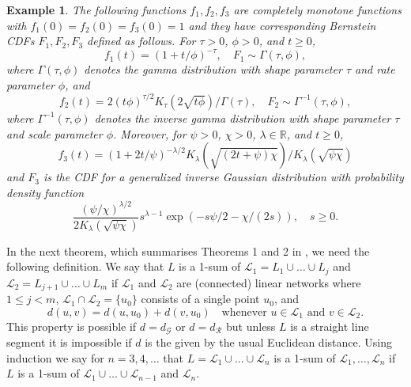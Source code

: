 \documentclass[alpha-refs]{wiley-article}
\newtheorem{ex}{Example}
\begin{document}
\begin{ex}\label{ex:0} 
The following functions $f_1,f_2,f_3$ are completely monotone functions with $f_1(0)=f_2(0)=f_3(0)=1$ and they have corresponding Bernstein CDFs $F_1,F_2,F_3$ defined as follows.
For $\tau>0$, $\phi>0$, and $t\ge0$,
\begin{equation}\label{e:f_1}
f_1(t)=(1+t/\phi)^{-\tau},\quad F_1\sim\Gamma(\tau,\phi),
\end{equation}
where $\Gamma(\tau,\phi)$ denotes the gamma distribution with shape parameter $\tau$ and rate parameter $\phi$, and
\begin{equation}\label{e:f_2}
f_2(t)={2(t\phi)^{\tau/2}}K_\tau(2\sqrt{t\phi})/{\Gamma(\tau)},\quad F_2\sim\Gamma^{-1}(\tau,\phi),
\end{equation}
where $\Gamma^{-1}(\tau,\phi)$ denotes the inverse gamma distribution with shape parameter $\tau$ and scale parameter $\phi$.
Moreover, for $\psi>0$, $\chi>0$, $\lambda\in\mathbb R$, and $t\ge0$,
\begin{equation}\label{e:f_3}
f_3(t)= (1+2t/\psi)^{-\lambda/2}{K_\lambda(\sqrt{(2t+\psi)\chi})}/{K_\lambda(\sqrt{\psi\chi})}
\end{equation}
and $F_3$ is the CDF for a generalized inverse Gaussian distribution with probability density function
\[
\frac{(\psi/\chi)^{\lambda/2}} {2K_\lambda(\sqrt{\psi\chi})} s^{\lambda-1}\exp(-s \psi/2 -\chi/(2s)),\quad s\ge 0.
\]
\end{ex}

In the next theorem, which summarises Theorems 1 and 2 in \citet[][]{AnderesEtAl}, we need the following definition. We say that $L$ is a 1-sum of $\mathcal L_1=L_1\cup\ldots\cup L_j$ and $\mathcal L_2=L_{j+1}\cup\ldots\cup L_m$ if $\mathcal L_1$ and $\mathcal L_2$ are (connected) linear networks where $1\le j<m$, $\mathcal L_1\cap\mathcal L_2=\{u_0\}$ consists of a single point $u_0$, and 
\[d(u,v)=d(u,u_0)+d(v,u_0)\quad\mbox{whenever $u\in\mathcal L_1$ and $v\in\mathcal L_2$.}\]
This property is possible if $d=d_{\mathcal G}$ or $d=d_{\mathcal R}$ but unless $L$ is a straight line segment it is impossible if $d$ is the given by the usual Euclidean distance. Using induction we say for $n=3,4,\ldots$ that $L=\mathcal L_1\cup\ldots\cup\mathcal L_n$ is a 1-sum of  $\mathcal L_1,\ldots,\mathcal L_n$ if $L$ is a 1-sum of $\mathcal L_1\cup\ldots\cup\mathcal L_{n-1}$ and $\mathcal L_n$. 
\end{document}
